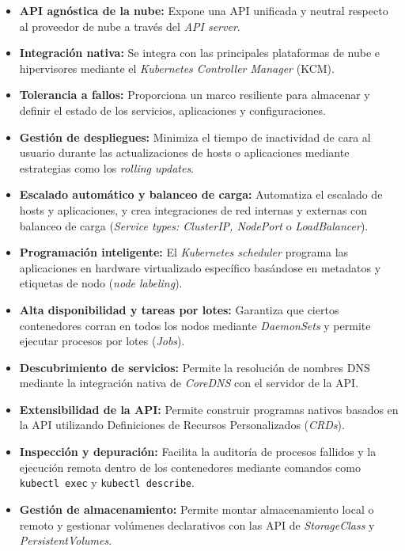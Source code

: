 \begin{itemize}
    \item \textbf{API agnóstica de la nube:} Expone una API unificada y neutral respecto al proveedor de nube a través del \textit{API server}.
    \item \textbf{Integración nativa:} Se integra con las principales plataformas de nube e hipervisores mediante el \textit{Kubernetes Controller Manager} (KCM).
    \item \textbf{Tolerancia a fallos:} Proporciona un marco resiliente para almacenar y definir el estado de los servicios, aplicaciones y configuraciones.
    \item \textbf{Gestión de despliegues:} Minimiza el tiempo de inactividad de cara al usuario durante las actualizaciones de hosts o aplicaciones mediante estrategias como los \textit{rolling updates}.
    \item \textbf{Escalado automático y balanceo de carga:} Automatiza el escalado de hosts y aplicaciones, y crea integraciones de red internas y externas con balanceo de carga (\textit{Service types: ClusterIP, NodePort} o \textit{LoadBalancer}).
    \item \textbf{Programación inteligente:} El \textit{Kubernetes scheduler} programa las aplicaciones en hardware virtualizado específico basándose en metadatos y etiquetas de nodo (\textit{node labeling}).
    \item \textbf{Alta disponibilidad y tareas por lotes:} Garantiza que ciertos contenedores corran en todos los nodos mediante \textit{DaemonSets} y permite ejecutar procesos por lotes (\textit{Jobs}).
    \item \textbf{Descubrimiento de servicios:} Permite la resolución de nombres DNS mediante la integración nativa de \textit{CoreDNS} con el servidor de la API.
    \item \textbf{Extensibilidad de la API:} Permite construir programas nativos basados en la API utilizando Definiciones de Recursos Personalizados (\textit{CRDs}).
    \item \textbf{Inspección y depuración:} Facilita la auditoría de procesos fallidos y la ejecución remota dentro de los contenedores mediante comandos como \texttt{kubectl exec} y \texttt{kubectl describe}.
    \item \textbf{Gestión de almacenamiento:} Permite montar almacenamiento local o remoto y gestionar volúmenes declarativos con las API de \textit{StorageClass} y \textit{PersistentVolumes}.
\end{itemize}

